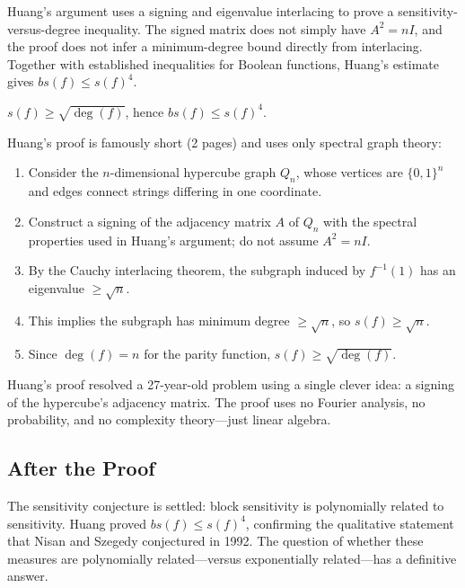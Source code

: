 Huang's argument uses a signing and eigenvalue interlacing to prove a sensitivity-versus-degree inequality. The signed matrix does not simply have $A^2=nI$, and the proof does not infer a minimum-degree bound directly from interlacing. Together with established inequalities for Boolean functions, Huang's estimate gives $bs(f)\leq s(f)^4$.

\begin{theorem}
$s(f) \ge \sqrt{\deg(f)}$, hence $bs(f) \le s(f)^4$.
\end{theorem}

Huang's proof is famously short (2 pages) and uses only spectral graph theory:

\begin{enumerate}
\item Consider the $n$-dimensional hypercube graph $Q_n$, whose vertices are $\{0,1\}^n$ and edges connect strings differing in one coordinate.
\item Construct a signing of the adjacency matrix $A$ of $Q_n$ with the spectral properties used in Huang's argument; do not assume $A^2=nI$.
\item By the Cauchy interlacing theorem, the subgraph induced by $f^{-1}(1)$ has an eigenvalue $\ge \sqrt{n}$.
\item This implies the subgraph has minimum degree $\ge \sqrt{n}$, so $s(f) \ge \sqrt{n}$.
\item Since $\deg(f) = n$ for the parity function, $s(f) \ge \sqrt{\deg(f)}$.
\end{enumerate}

\begin{highlightbox}
Huang's proof resolved a 27-year-old problem using a single clever idea: a signing of the hypercube's adjacency matrix. The proof uses no Fourier analysis, no probability, and no complexity theory---just linear algebra.
\end{highlightbox}

\subsection{After the Proof}

The sensitivity conjecture is settled: block sensitivity is polynomially related to sensitivity. Huang proved $bs(f) \le s(f)^4$, confirming the qualitative statement that Nisan and Szegedy conjectured in 1992. The question of whether these measures are polynomially related---versus exponentially related---has a definitive answer.

